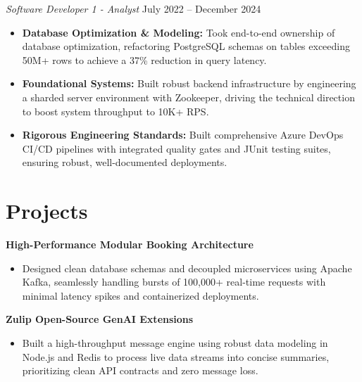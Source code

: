 \documentclass[11pt,a4paper]{article}
\begin{document}
\vspace{3pt}
\noindent
\textit{Software Developer 1 - Analyst} \hfill July 2022 -- December 2024
\begin{itemize}[leftmargin=*,noitemsep,topsep=0pt]
    \item \textbf{Database Optimization \& Modeling:} Took end-to-end ownership of database optimization, refactoring PostgreSQL schemas on tables exceeding 50M+ rows to achieve a 37\% reduction in query latency.
    \item \textbf{Foundational Systems:} Built robust backend infrastructure by engineering a sharded server environment with Zookeeper, driving the technical direction to boost system throughput to 10K+ RPS.
    \item \textbf{Rigorous Engineering Standards:} Built comprehensive Azure DevOps CI/CD pipelines with integrated quality gates and JUnit testing suites, ensuring robust, well-documented deployments.
\end{itemize}

\vspace{-5pt}
\section{Projects}
\noindent
\textbf{High-Performance Modular Booking Architecture}
\begin{itemize}[leftmargin=*,noitemsep,topsep=0pt]
    \item Designed clean database schemas and decoupled microservices using Apache Kafka, seamlessly handling bursts of 100,000+ real-time requests with minimal latency spikes and containerized deployments.
\end{itemize}

\vspace{3pt}
\noindent
\textbf{Zulip Open-Source GenAI Extensions}
\begin{itemize}[leftmargin=*,noitemsep,topsep=0pt]
    \item Built a high-throughput message engine using robust data modeling in Node.js and Redis to process live data streams into concise summaries, prioritizing clean API contracts and zero message loss.
\end{itemize}
\end{document}
